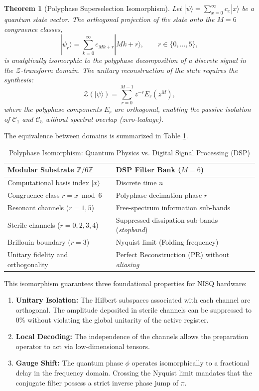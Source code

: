 \documentclass[12pt,a4paper]{article}
\theoremstyle{plain}
\newtheorem{theorem}{Theorem}[section]
\theoremstyle{definition}
\theoremstyle{remark}
\begin{document}
\begin{theorem}[Polyphase Superselection Isomorphism]
Let $|\psi\rangle = \sum_{x=0}^{\infty} c_x |x\rangle$ be a quantum state vector. The orthogonal projection of the state onto the $M=6$ congruence classes,
\begin{equation}
|\psi_r\rangle = \sum_{k=0}^{\infty} c_{Mk + r} |Mk+r\rangle, \qquad r \in \{0,\dots,5\},
\end{equation}
is analytically isomorphic to the polyphase decomposition of a discrete signal in the $\mathcal{Z}$-transform domain. The unitary reconstruction of the state requires the synthesis:
\begin{equation}
\mathcal{Z}(|\psi\rangle) = \sum_{r=0}^{M-1} z^{-r} E_r(z^M),
\end{equation}
where the polyphase components $E_r$ are orthogonal, enabling the passive isolation of $\mathcal{C}_1$ and $\mathcal{C}_5$ without spectral overlap (\textit{zero-leakage}).
\end{theorem}

The equivalence between domains is summarized in Table \ref{tab:isomorfismo}.

\begin{table}[H]
\centering
\caption{Polyphase Isomorphism: Quantum Physics vs. Digital Signal Processing (DSP)}
\label{tab:isomorfismo}
\begin{tabular}{ll}
\toprule
\textbf{Modular Substrate $\mathbb{Z}/6\mathbb{Z}$} & \textbf{DSP Filter Bank ($M=6$)} \\
\midrule
Computational basis index $|x\rangle$ & Discrete time $n$ \\
Congruence class $r = x \bmod 6$ & Polyphase decimation phase $r$ \\
Resonant channels ($r=1,5$) & Free-spectrum information sub-bands \\
Sterile channels ($r=0,2,3,4$) & Suppressed dissipation sub-bands (\textit{stopband}) \\
Brillouin boundary ($r=3$) & Nyquist limit (Folding frequency) \\
Unitary fidelity and orthogonality & Perfect Reconstruction (PR) without \textit{aliasing} \\
\bottomrule
\end{tabular}
\end{table}

This isomorphism guarantees three foundational properties for NISQ hardware:
\begin{enumerate}
    \item \textbf{Unitary Isolation:} The Hilbert subspaces associated with each channel are orthogonal. The amplitude deposited in sterile channels can be suppressed to $0\%$ without violating the global unitarity of the active register.
    \item \textbf{Local Decoding:} The independence of the channels allows the preparation operator to act via low-dimensional tensors.
    \item \textbf{Gauge Shift:} The quantum phase $\phi$ operates isomorphically to a fractional delay in the frequency domain. Crossing the Nyquist limit mandates that the conjugate filter possess a strict inverse phase jump of $\pi$.
\end{enumerate}
\end{document}
